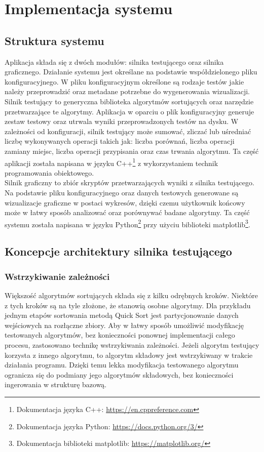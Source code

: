\chapter{Implementacja systemu}
\thispagestyle{chapterBeginStyle}


\section{Struktura systemu}
Aplikacja składa się z dwóch modułów: silnika testującego oraz silnika graficznego.
Działanie systemu jest określane na podstawie współdzielonego pliku konfiguracyjnego. W pliku konfiguracyjnym
określone są rodzaje testów jakie należy przeprowadzić oraz metadane potrzebne do wygenerowania wizualizacji.\\

Silnik testujący to generyczna biblioteka algorytmów sortujących oraz narzędzie przetwarzające
te algorytmy. Aplikacja w oparciu o plik konfiguracyjny generuje zestaw testowy oraz utrwala
wyniki przeprowadzonych testów na dysku. W zależności od konfiguracji, silnik testujący może
sumować, zliczać lub uśredniać liczbę wykonywanych operacji takich jak: liczba porównań, liczba
operacji zamiany miejsc, liczba operacji przypisania oraz czas trwania algorytmu. Ta część aplikacji
została napisana w języku C++\footnote{Dokumentacja języka C++: \url{https://en.cppreference.com}}
z wykorzystaniem technik programowania obiektowego.\\

Silnik graficzny to zbiór skryptów przetwarzających wyniki z silnika testującego. Na podstawie pliku
konfiguracyjnego oraz danych testowych generowane są wizualizacje graficzne w postaci wykresów, dzięki
czemu użytkownik końcowy może w łatwy sposób analizować oraz porównywać badane algorytmy. Ta część
systemu została napisana w języku Python\footnote{Dokumentacja języka Python: \url{https://docs.python.org/3/}}
przy użyciu biblioteki matplotlib\footnote{Dokumentacja biblioteki matplotlib: \url{https://matplotlib.org/}}.


\section{Koncepcje architektury silnika testującego}

\subsection{Wstrzykiwanie zależności}
Większość algorytmów sortujących składa się z kilku odrębnych kroków. Niektóre z tych kroków są na tyle
złożone, że stanowią osobne algorytmy. Dla przykładu jednym etapów sortowania metodą Quick Sort
jest partycjonowanie danych wejściowych na rozłączne zbiory. Aby w łatwy sposób umożliwić modyfikację
testowanych algorytmów, bez konieczności ponownej implementacji całego procesu, zastosowano technikę
wstrzykiwania zależności. Jeżeli algorytm testujący korzysta z innego algorytmu, to algorytm składowy
jest wstrzykiwany w trakcie działania programu. Dzięki temu lekka modyfikacja testowanego algorytmu
ogranicza się do podmiany jego algorytmów składowych, bez konieczności ingerowania w strukturę bazową.

